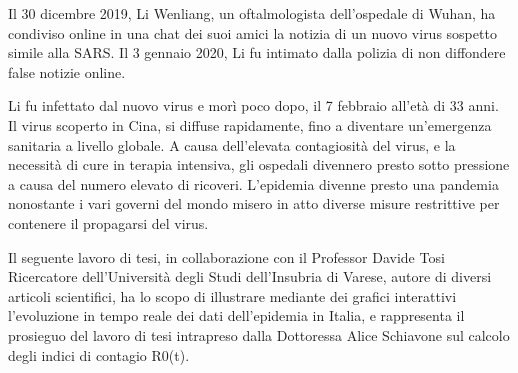 
Il 30 dicembre 2019, Li Wenliang, un oftalmologista dell’ospedale di Wuhan, ha condiviso online in una chat dei suoi amici la notizia di un nuovo virus sospetto simile alla SARS.
Il 3 gennaio 2020, Li fu intimato dalla polizia di non diffondere false notizie online.

Li fu infettato dal nuovo virus e morì poco dopo, il 7 febbraio all’età di 33 anni.
Il virus scoperto in Cina, si diffuse rapidamente, fino a diventare un'emergenza sanitaria a livello globale.
A causa dell’elevata contagiosità del virus, e la necessità di cure in terapia intensiva, gli ospedali divennero presto sotto pressione a causa del numero elevato di ricoveri.
L'epidemia divenne presto una pandemia nonostante i vari governi del mondo misero in atto diverse misure restrittive per contenere il propagarsi del virus.

Il seguente lavoro di tesi, in collaborazione con il Professor Davide Tosi Ricercatore dell’Università degli Studi dell’Insubria di Varese, autore di diversi articoli scientifici\cite{tosi_1}\cite{tosi_2}\cite{tosi_3}, ha lo scopo di illustrare mediante dei grafici interattivi l’evoluzione in tempo reale dei dati dell’epidemia in Italia, e rappresenta il prosieguo del lavoro di tesi intrapreso dalla Dottoressa Alice Schiavone sul calcolo degli indici di contagio R0(t)\cite{schiavone_tesi}.